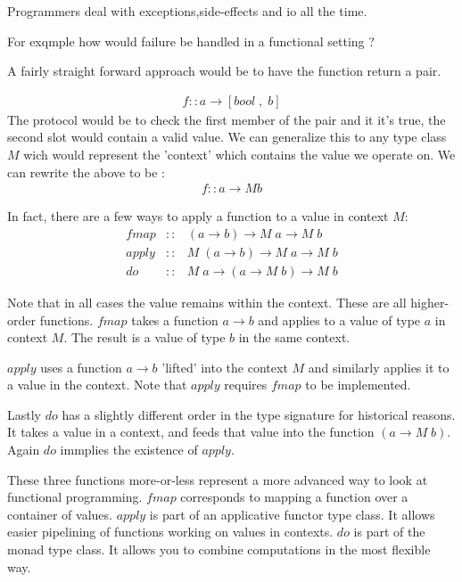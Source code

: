 \documentclass[12pt,fleqn]{article}
\begin{document}
Programmers deal with exceptions,side-effects and io all the time.

For exqmple how would failure be handled in a functional setting ?

A fairly straight forward approach would be to have the function return a pair.

\begin{eqnarray*}
f :: a \rightarrow [ bool \;,\; b ]
\end{eqnarray*}
The protocol would be to check the first member of the pair and it it's true, the second slot would contain a valid value.
We can generalize this to any type class $M$ wich would represent the 'context' which contains the value we operate on.
We can rewrite the above to be :
\begin{eqnarray*}
f :: a \rightarrow M b
\end{eqnarray*}

In fact, there are a few  ways to apply a function to a value in  context $M$:
\begin{eqnarray*}
fmap  &::& (a \rightarrow b) \rightarrow M\;a \rightarrow M \;b \\
apply &::& M \; (a \rightarrow b) \rightarrow M\;a \rightarrow M \;b \\
do    &::& M \; a \rightarrow (a \rightarrow M\; b) \rightarrow M \; b
\end{eqnarray*}

Note that in all cases the value remains within the context. 
These are all higher-order functions.
$fmap$ takes a function $a \rightarrow b$ and applies to a value of type $a$ in context $M$. 
The result is a value of type $b$ in the same context.

$apply$ uses a function $a \rightarrow b$ 'lifted' into the context $M$ and similarly applies it to a value in the context.
Note that $apply$ requires $fmap$ to be implemented.

Lastly $do$ has a slightly different order in the type signature for historical reasons. 
It takes a value in a context, and feeds that value into the function $(a \rightarrow M\; b)$.
Again $do$ immplies the existence of $apply$.

These three functions more-or-less represent a more advanced way to look at functional programming.
$fmap$ corresponds to mapping a function over a container of values.
$apply$ is part of an applicative functor type class.
It allows easier pipelining of functions working on values in contexts.
$do$ is part of the monad type class. 
It allows you to combine computations in the most flexible way.
\end{document}
